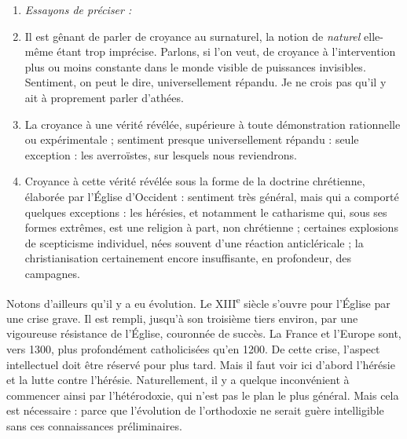 \documentclass[french,twoside]{book} %
\newlength{\listmod}
\newcommand{\listhead}[1]{\hspace{-1\listmod}\emph{#1}}
\begin{document}
\begin{enumerate}[itemsep=0pt,]
\item[]\listhead{Essayons de préciser :}
\item Il est gênant de parler de croyance au surnaturel, la notion de \emph{naturel} elle-même étant trop imprécise. Parlons, si l’on veut, de croyance à l’intervention plus ou moins constante dans le monde visible de puissances invisibles. Sentiment, on peut le dire, universellement répandu. Je ne crois pas qu’il y ait à proprement parler d’athées.
\item La croyance à une vérité révélée, supérieure à toute démonstration rationnelle ou expérimentale ; sentiment presque universellement répandu : seule exception : les averroïstes, sur lesquels nous reviendrons.
\item Croyance à cette vérité révélée sous la forme de la doctrine chrétienne, élaborée par l’Église d’Occident : sentiment très général, mais qui a comporté quelques exceptions : les hérésies, et notamment le catharisme qui, sous ses formes extrêmes, est une religion à part, non chrétienne ; certaines explosions de scepticisme individuel, nées souvent d’une réaction anticléricale ; la christianisation certainement encore insuffisante, en profondeur, des campagnes.

\end{enumerate}\noindent Notons d’ailleurs qu’il y a eu évolution. Le XIII\textsuperscript{e} siècle s’ouvre pour l’Église par une crise grave. Il est rempli, jusqu’à son troisième tiers environ, par une vigoureuse résistance de l’Église, couronnée de succès. La France et l’Europe sont, vers 1300, plus profondément catholicisées qu’en 1200. De cette crise, l’aspect intellectuel doit être réservé pour plus tard. Mais il faut voir ici d’abord l’hérésie et la lutte contre l’hérésie. Naturellement, il y a quelque inconvénient à commencer ainsi par l’hétérodoxie, qui n’est pas le plan le plus général. Mais cela est nécessaire : parce que l’évolution de l’orthodoxie ne serait guère intelligible sans ces connaissances préliminaires.
\end{document}
